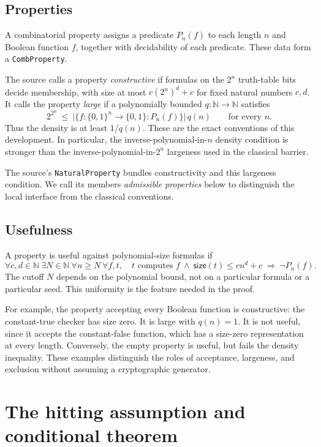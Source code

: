 \documentclass[11pt]{amsart}
\theoremstyle{plain}
\theoremstyle{definition}
\newcommand{\size}{\mathsf{size}}
\begin{document}
\subsection{Properties}

A combinatorial property assigns a predicate $P_n(f)$ to each length
$n$ and Boolean function $f$, together with decidability of each
predicate. These data form a \texttt{CombProperty}.

The source calls a property \emph{constructive} if formulas on the
$2^n$ truth-table bits decide membership, with size at most
$c(2^n)^d+c$ for fixed natural numbers $c,d$.
It calls the property \emph{large} if a polynomially bounded
$q:\mathbb N\to\mathbb N$ satisfies
\[
 2^{2^n}\ \le\
       \bigl|\{f:\{0,1\}^n\to\{0,1\}:P_n(f)\}\bigr|\,q(n)
       \qquad\text{for every }n.
\]
Thus the density is at least $1/q(n)$. These are the exact conventions
of this development. In particular, the inverse-polynomial-in-$n$
density condition is stronger than the inverse-polynomial-in-$2^n$
largeness used in the classical barrier.

The source's \texttt{NaturalProperty} bundles constructivity and this
largeness condition. We call its members \emph{admissible properties}
below to distinguish the local interface from the classical conventions.

\subsection{Usefulness}

A property is useful against polynomial-size formulas if
\[
 \forall c,d\in\mathbb N\ \exists N\in\mathbb N\
 \forall n\ge N\ \forall f,t,\quad
 t\text{ computes }f\ \land\ \size(t)\le c n^d+c
 \ \Longrightarrow\ \neg P_n(f).
 \tag{1}\label{eq:useful}
\]
The cutoff $N$ depends on the polynomial bound, not on a particular
formula or a particular seed. This uniformity is the feature needed
in the proof.

For example, the property accepting every Boolean function is
constructive: the constant-true checker has size zero. It is large
with $q(n)=1$. It is not useful, since it accepts the constant-false
function, which has a size-zero representation at every length.
Conversely, the empty property is useful, but fails the density
inequality. These examples distinguish the roles of acceptance,
largeness, and exclusion without assuming a cryptographic generator.

\section{The hitting assumption and conditional theorem}
\label{sec:conditional}
\end{document}
